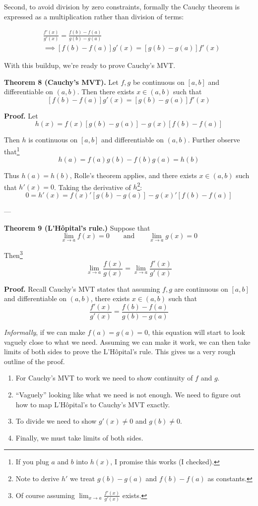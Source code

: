 \vs

Second, to avoid division by zero constraints, formally the Cauchy
theorem is expressed as a multiplication rather than division of
terms:

\begin{align*}
  &\frac{f'(x)}{g'(x)}=\frac{f(b)-f(a)}{g(b)-g(a)}\\
  &\implies [f(b)-f(a)]g'(x)=[g(b)-g(a)]f'(x)
\end{align*}

With this buildup, we're ready to prove Cauchy's MVT.

\vs

\textbf{Theorem 8 (Cauchy's MVT).} Let $f,g$ be continuous on $[a,b]$
and differentiable on $(a,b)$. Then there exists $x\in(a,b)$ such that
\[[f(b)-f(a)]g'(x)=[g(b)-g(a)]f'(x)\]

\vs

\textbf{Proof.} Let
\[h(x)=f(x)[g(b)-g(a)]-g(x)[f(b)-f(a)]\]

Then $h$ is continuous on $[a,b]$ and differentiable on $(a,b)$.
Further observe that\footnote{If you plug $a$ and $b$ into $h(x)$, I
  promise this works (I checked).}
\[h(a)=f(a)g(b)-f(b)g(a)=h(b)\]

Thus $h(a)=h(b)$, Rolle's theorem applies, and there exists
$x\in(a,b)$ such that $h'(x)=0$. Taking the derivative of
$h$\footnote{Note to derive $h'$ we treat $g(b)-g(a)$ and $f(b)-f(a)$
  as constants.}:
\[0=h'(x)=f(x)'[g(b)-g(a)]-g(x)'[f(b)-f(a)]\]

---\vs

\textbf{Theorem 9 (L'H\^opital's rule.)} Suppose that
\[\lim_{x\to a}f(x)=0\qquad\text{and}\qquad\lim_{x\to a}g(x)=0\]

Then\footnote{Of course assuming $\lim_{x\to a}\frac{f'(x)}{g'(x)}$ exists.}
\[\lim_{x\to a}\frac{f(x)}{g(x)}=\lim_{x\to a}\frac{f'(x)}{g'(x)}\]

\textbf{Proof.} Recall Cauchy's MVT states that assuming $f,g$ are
continuous on $[a,b]$ and differentiable on $(a,b)$, there exists
$x\in(a,b)$ such that
\[\frac{f'(x)}{g'(x)}=\frac{f(b)-f(a)}{g(b)-g(a)}\]

\textit{Informally}, if we can make $f(a)=g(a)=0$, this equation will
start to look vaguely close to what we need. Assuming we can make it
work, we can then take limits of both sides to prove the L'H\^opital's
rule. This gives us a very rough outline of the proof.
\begin{enumerate}
\item For Cauchy's MVT to work we need to show continuity of $f$ and
  $g$.
\item ``Vaguely'' looking like what we need is not enough. We need to
  figure out how to map L'H\^opital's to Cauchy's MVT exactly.
\item To divide we need to show $g'(x)\neq0$ and $g(b)\neq0$.
\item Finally, we must take limits of both sides.
\end{enumerate}

